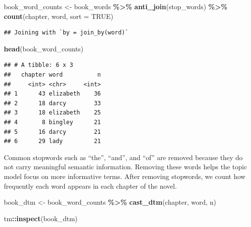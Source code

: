 \documentclass[
]{article}
\newenvironment{Shaded}{\begin{snugshade}}{\end{snugshade}}
\newcommand{\AttributeTok}[1]{\textcolor[rgb]{0.13,0.29,0.53}{#1}}
\newcommand{\ConstantTok}[1]{\textcolor[rgb]{0.56,0.35,0.01}{#1}}
\newcommand{\FunctionTok}[1]{\textcolor[rgb]{0.13,0.29,0.53}{\textbf{#1}}}
\newcommand{\NormalTok}[1]{#1}
\newcommand{\OtherTok}[1]{\textcolor[rgb]{0.56,0.35,0.01}{#1}}
\newcommand{\SpecialCharTok}[1]{\textcolor[rgb]{0.81,0.36,0.00}{\textbf{#1}}}
\begin{document}
\begin{Shaded}
\begin{Highlighting}[]
\NormalTok{book\_word\_counts }\OtherTok{\textless{}{-}}\NormalTok{ book\_words }\SpecialCharTok{\%\textgreater{}\%}
  \FunctionTok{anti\_join}\NormalTok{(stop\_words) }\SpecialCharTok{\%\textgreater{}\%}
  \FunctionTok{count}\NormalTok{(chapter, word, }\AttributeTok{sort =} \ConstantTok{TRUE}\NormalTok{)}
\end{Highlighting}
\end{Shaded}

\begin{verbatim}
## Joining with `by = join_by(word)`
\end{verbatim}

\begin{Shaded}
\begin{Highlighting}[]
\FunctionTok{head}\NormalTok{(book\_word\_counts)}
\end{Highlighting}
\end{Shaded}

\begin{verbatim}
## # A tibble: 6 x 3
##   chapter word          n
##     <int> <chr>     <int>
## 1      43 elizabeth    36
## 2      18 darcy        33
## 3      18 elizabeth    25
## 4       8 bingley      21
## 5      16 darcy        21
## 6      29 lady         21
\end{verbatim}

Common stopwords such as ``the'', ``and'', and ``of'' are removed
because they do not carry meaningful semantic information. Removing
these words helps the topic model focus on more informative terms. After
removing stopwords, we count how frequently each word appears in each
chapter of the novel.

\begin{Shaded}
\begin{Highlighting}[]
\NormalTok{book\_dtm }\OtherTok{\textless{}{-}}\NormalTok{ book\_word\_counts }\SpecialCharTok{\%\textgreater{}\%}
  \FunctionTok{cast\_dtm}\NormalTok{(chapter, word, n)}

\NormalTok{tm}\SpecialCharTok{::}\FunctionTok{inspect}\NormalTok{(book\_dtm)}
\end{Highlighting}
\end{Shaded}
\end{document}

